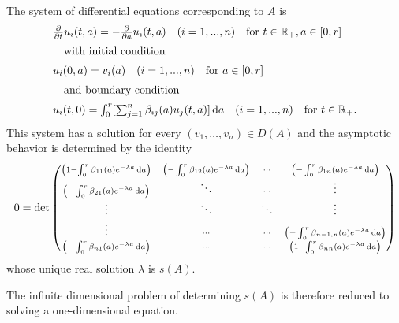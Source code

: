 \begin{example}
The system of differential equations corresponding to $A$ is
\begin{equation} \label{eq:c4-3.13}
\begin{array}{l}
\frac{\partial}{\partial t}u_i(t,a) = - \frac{\partial}{\partial a}u_i(t,a) \quad (i=1,...,n) \quad \text{for } t\in\mathbb{R}_+, a\in[0,r]\\[2mm]
\quad \text{with initial condition} \\[2mm]
u_i(0,a) = v_i(a) \quad (i=1,...,n) \quad \text{for } a\in[0,r] \\[2mm]
\quad \text{and boundary condition} \\[2mm]
u_i(t,0) = \int_0^r [\sum_{j=1}^n \beta_{ij}(a)u_j(t,a)]\mathop{}\!\mathrm{d}{a} \quad (i=1,...,n) \quad \text{for } t\in\mathbb{R}_+.
\end{array}
\end{equation}
This system has a solution for every $(v_{1}, \ldots, v_{n}) \in D(A)$ and the asymptotic behavior is determined by the identity
\[
0 = \det
\begin{pmatrix}\scriptstyle{
 \left(1 - \int_{0}^{r} \beta_{11}(a)e^{-\lambda a} \mathop{}\!\mathrm{d}{a}\right)} 
  & \scriptstyle{ \left(-\int_{0}^{r} \beta_{12}(a)e^{-\lambda a} \mathop{}\!\mathrm{d}{a}\right)} 
  & \scriptstyle{\cdots} 
  & \scriptstyle{ \left(-\int_{0}^{r} \beta_{1n}(a)e^{-\lambda a} \mathop{}\!\mathrm{d}{a}\right)} \\
\scriptstyle{ \left(-\int_{0}^{r} \beta_{21}(a)e^{-\lambda a} \mathop{}\!\mathrm{d}{a}\right)} 
  & \scriptstyle{\ddots} 
  & \scriptstyle{\cdots}
  & \scriptstyle{\vdots} \\
\scriptstyle{\vdots}
  & \scriptstyle{\ddots}  
  & \scriptstyle{\ddots}   
  & \scriptstyle{\vdots}  \\
\vdots
  & \scriptstyle{\cdots}  
  & \scriptstyle{\cdots}
  & \scriptstyle{ \left(-\int_{0}^{r} \beta_{n-1,n}(a)e^{-\lambda a} \mathop{}\!\mathrm{d}{a}\right)} \\
\scriptstyle{ \left(-\int_{0}^{r} \beta_{n1}(a)e^{-\lambda a} \mathop{}\!\mathrm{d}{a}\right)} 
  & \scriptstyle{\cdots} 
  & \scriptstyle{\cdots}
  & \scriptstyle{ \left(1 - \int_{0}^{r} \beta_{nn}(a)e^{-\lambda a} \mathop{}\!\mathrm{d}{a}\right)}
\end{pmatrix}
\]
whose unique real solution $\lambda$ is $s(A)$.

The infinite dimensional problem of determining $s(A)$ is therefore reduced to solving a one-dimensional equation.
\end{example}

